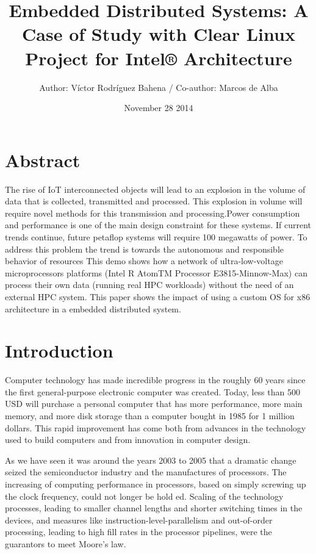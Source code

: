 \documentclass[a4paper]{article}
\title{Embedded Distributed Systems: A Case of Study with Clear Linux Project
for Intel® Architecture }
\author{\normalsize Author: Víctor Rodríguez Bahena / Co-author: Marcos de Alba \\\normalsize}
\date{\color{black}November 28 2014}
\begin{document}
 \maketitle

\section{Abstract}


The rise of IoT interconnected objects will lead to an explosion in the volume of data that is collected, transmitted and processed. This explosion in volume will require novel methods for this transmission and processing.Power consumption and performance is one of the main design constraint for these systems. If current trends continue, future petaflop systems will require 100 megawatts of power. To address this problem the trend is towards the autonomous and responsible behavior of resources This demo shows how a network of ultra-low-voltage microprocessors platforms (Intel R AtomTM Processor E3815-Minnow-Max) can process their own data (running real HPC workloads) without the need of  an external HPC system. This paper shows the impact of using a custom OS for x86 architecture in a embedded distributed system. 
 

\section{Introduction}

Computer technology has made incredible progress in the roughly 60 years since
the first general-purpose electronic computer was created. Today, less than 500
USD will purchase a personal computer that has more performance, more main
memory, and more disk storage than a computer bought in 1985 for 1 million
dollars. This rapid improvement has come both from advances in the technology
used to build computers and from innovation in computer design. \cite{Hennessy} 

As we have seen it was around the years 2003 to 2005 that a dramatic change
seized the semiconductor industry and the manufactures of processors. The
increasing of computing performance in processors, based on simply screwing up
the clock frequency, could not longer be hold ed. Scaling of the technology
processes, leading to smaller channel lengths and shorter switching times in the
devices, and measures like instruction-level-parallelism and out-of-order
processing, leading to high fill rates in the processor pipelines, were the
guarantors to meet Moore’s law.\cite{AMDAHL}
\end{document}

